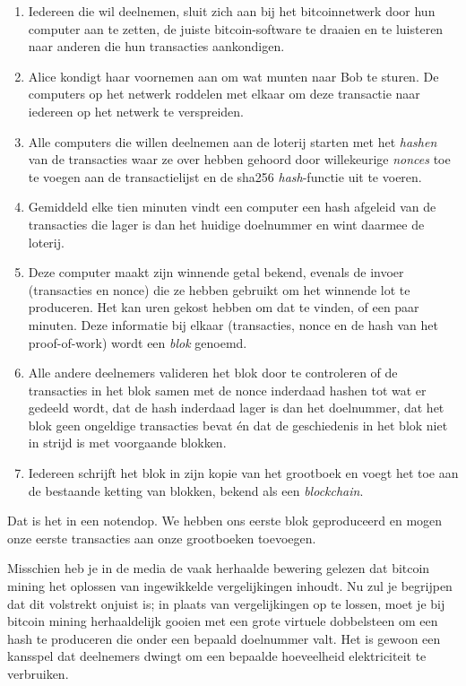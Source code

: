 \documentclass[smalldemyvopaper,11pt,twoside,onecolumn,openright,extrafontsizes]{memoir}
\begin{document}
\begin{enumerate}
    \item Iedereen die wil deelnemen, sluit zich aan bij het bitcoinnetwerk door hun computer aan te zetten, de juiste bitcoin-software te draaien en te luisteren naar anderen die hun transacties aankondigen.
    \item Alice kondigt haar voornemen aan om wat munten naar Bob te sturen. De computers op het netwerk \textquotedbl{}roddelen\textquotedbl{} met elkaar om deze transactie naar iedereen op het netwerk te verspreiden.
    \item Alle computers die willen deelnemen aan de loterij starten met het \textit{hashen} van de transacties waar ze over hebben gehoord door willekeurige \textit{nonces} toe te voegen aan de transactielijst en de sha256 \textit{hash}-functie uit te voeren.
    \item Gemiddeld elke tien minuten vindt een computer een hash afgeleid van de transacties die lager is dan het huidige doelnummer en wint daarmee de loterij.
    \item Deze computer maakt zijn winnende getal bekend, evenals de invoer (transacties en nonce) die ze hebben gebruikt om het winnende lot te produceren. Het kan uren gekost hebben om dat te vinden, of een paar minuten. Deze informatie bij elkaar (transacties, nonce en de hash van het proof-of-work) wordt een \textit{blok} genoemd.
    \item Alle andere deelnemers valideren het blok door te controleren of de transacties in het blok samen met de nonce inderdaad hashen tot wat er gedeeld wordt, dat de hash inderdaad lager is dan het doelnummer, dat het blok geen ongeldige transacties bevat én dat de geschiedenis in het blok niet in strijd is met voorgaande blokken.
    \item Iedereen schrijft het blok in zijn kopie van het grootboek en voegt het toe aan de bestaande ketting van blokken, bekend als een \textit{blockchain}.
\end{enumerate}

Dat is het in een notendop. We hebben ons eerste blok geproduceerd en mogen onze eerste transacties aan onze grootboeken toevoegen.

Misschien heb je in de media de vaak herhaalde bewering gelezen dat bitcoin mining het oplossen van ingewikkelde vergelijkingen inhoudt. Nu zul je begrijpen dat dit volstrekt onjuist is; in plaats van vergelijkingen op te lossen, moet je bij bitcoin mining herhaaldelijk gooien met een grote virtuele dobbelsteen om een hash te produceren die onder een bepaald doelnummer valt. Het is gewoon een kansspel dat deelnemers dwingt om een bepaalde hoeveelheid elektriciteit te verbruiken.
\end{document}
